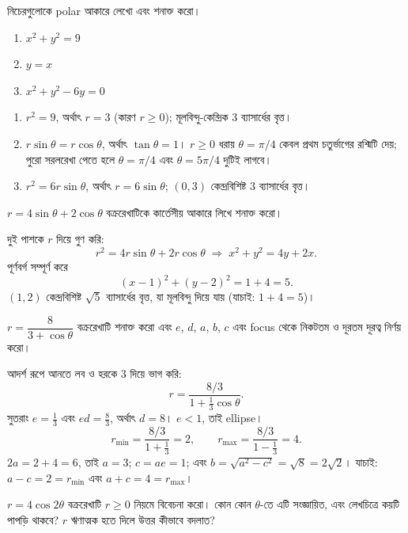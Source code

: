 \documentclass[11pt]{article}
\begin{document}
 নিচেরগুলোকে polar আকারে লেখো এবং শনাক্ত করো।
\begin{enumerate}
  \item $x^{2}+y^{2} = 9$
  \item $y = x$
  \item $x^{2}+y^{2}-6y = 0$
\end{enumerate}

\begin{sol}
\begin{enumerate}
  \item $r^{2} = 9$, অর্থাৎ $r = 3$ (কারণ $r \geq 0$); মূলবিন্দু-কেন্দ্রিক
        $3$ ব্যাসার্ধের বৃত্ত।
  \item $r\sin\theta = r\cos\theta$, অর্থাৎ $\tan\theta = 1$। $r \geq 0$ ধরায়
        $\theta = \pi/4$ কেবল প্রথম চতুর্ভাগের রশ্মিটি দেয়; পুরো সরলরেখা পেতে
        হলে $\theta = \pi/4$ এবং $\theta = 5\pi/4$ দুটিই লাগবে।
  \item $r^{2} = 6r\sin\theta$, অর্থাৎ $r = 6\sin\theta$; $(0,3)$
        কেন্দ্রবিশিষ্ট $3$ ব্যাসার্ধের বৃত্ত।
\end{enumerate}
\end{sol}

 $r = 4\sin\theta + 2\cos\theta$ বক্ররেখাটিকে কার্তেসীয় আকারে লিখে
শনাক্ত করো।

\begin{sol}
দুই পাশকে $r$ দিয়ে গুণ করি:
\[
  r^{2} = 4r\sin\theta + 2r\cos\theta
  \;\Longrightarrow\; x^{2}+y^{2} = 4y + 2x .
\]
পূর্ণবর্গ সম্পূর্ণ করে
\[
  (x-1)^{2} + (y-2)^{2} = 1 + 4 = 5 .
\]
$(1,2)$ কেন্দ্রবিশিষ্ট $\sqrt{5}$ ব্যাসার্ধের বৃত্ত, যা মূলবিন্দু দিয়ে যায়
(যাচাই: $1 + 4 = 5$)।
\end{sol}

 $r = \dfrac{8}{3 + \cos\theta}$ বক্ররেখাটি শনাক্ত করো এবং $e$, $d$,
$a$, $b$, $c$ এবং focus থেকে নিকটতম ও দূরতম দূরত্ব নির্ণয় করো।

\begin{sol}
আদর্শ রূপে আনতে লব ও হরকে $3$ দিয়ে ভাগ করি:
\[
  r = \frac{8/3}{1 + \tfrac{1}{3}\cos\theta} .
\]
সুতরাং $e = \tfrac{1}{3}$ এবং $ed = \tfrac{8}{3}$, অর্থাৎ $d = 8$। $e<1$, তাই
ellipse।
\[
  r_{\min} = \frac{8/3}{1+\tfrac{1}{3}} = 2, \qquad
  r_{\max} = \frac{8/3}{1-\tfrac{1}{3}} = 4 .
\]
$2a = 2 + 4 = 6$, তাই $a = 3$; $c = ae = 1$; এবং
$b = \sqrt{a^{2}-c^{2}} = \sqrt{8} = 2\sqrt{2}$।
যাচাই: $a - c = 2 = r_{\min}$ এবং $a + c = 4 = r_{\max}$।
\end{sol}

 $r = 4\cos 2\theta$ বক্ররেখাটি $r \geq 0$ নিয়মে বিবেচনা করো। কোন কোন
$\theta$-তে এটি সংজ্ঞায়িত, এবং লেখচিত্রে কয়টি পাপড়ি থাকবে? $r$ ঋণাত্মক হতে
দিলে উত্তর কীভাবে বদলাত?
\end{document}
